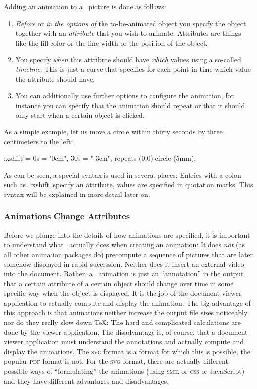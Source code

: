 Adding an animation to a \tikzname\ picture is done as follows:
%
\begin{enumerate}
    \item \emph{Before} or \emph{in the options of} the to-be-animated object
        you specify the object together with an \emph{attribute} that you wish
        to animate. Attributes are things like the fill color or the line width
        or the position of the object.
    \item You specify \emph{when} this attribute should have \emph{which}
        values using a so-called \emph{timeline}. This is just a curve that
        specifies for each point in time which value the attribute should have.
    \item You can additionally use further options to configure the animation,
        for instance you can specify that the animation should repeat or that
        it should only start when a certain object is clicked.
\end{enumerate}

As a simple example, let us move a circle within thirty seconds by three
centimeters to the left:
%
\begin{codeexample}[width=2cm,preamble={\usetikzlibrary{animations}}]
\tikz \draw :xshift = {0s = "0cm", 30s = "-3cm", repeats} (0,0) circle (5mm);
\end{codeexample}

As can be seen, a special syntax is used in several places: Entries with a
colon such as |:xshift| specify an attribute, values are specified in quotation
marks. This syntax will be explained in more detail later on.


\subsubsection{Animations Change Attributes}

Before we plunge into the details of how animations are specified, it is
important to understand what \tikzname\ actually does when creating an
animation: It does \emph{not} (as all other animation packages do) precompute a
sequence of pictures that are later somehow displayed in rapid succession.
Neither does it insert an external video into the document. Rather, a
\tikzname\ animation is just an ``annotation'' in the output that a certain
attribute of a certain object should change over time in some specific way when
the object is displayed. It is the job of the document viewer application to
actually compute and display the animation. The big advantage of this approach
is that animations neither increase the output file sizes noticeably nor do
they really slow down \TeX: The hard and complicated calculations are done by
the viewer application. The disadvantage is, of course, that a document viewer
application must understand the annotations and actually compute and display
the animations. The \textsc{svg} format is a format for which this is possible,
the popular \textsc{pdf} format is not. For the \textsc{svg} format, there are
actually different possible ways of ``formulating'' the animations (using
\textsc{smil} or \textsc{css} or JavaScript) and they have different advantages
and disadvantages.

